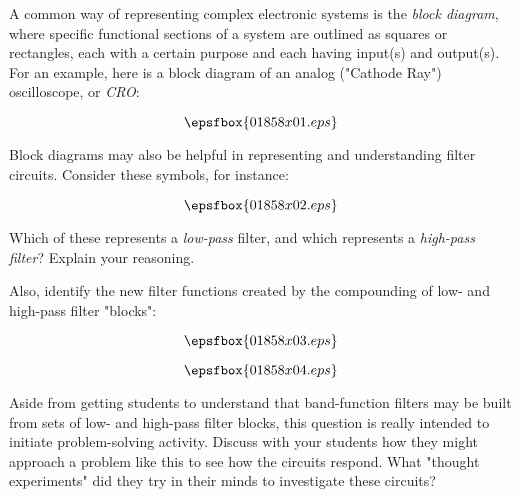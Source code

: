 

A common way of representing complex electronic systems is the {\it block diagram}, where specific functional sections of a system are outlined as squares or rectangles, each with a certain purpose and each having input(s) and output(s).  For an example, here is a block diagram of an analog ("Cathode Ray") oscilloscope, or {\it CRO}:

$$\epsfbox{01858x01.eps}$$

Block diagrams may also be helpful in representing and understanding filter circuits.  Consider these symbols, for instance:

$$\epsfbox{01858x02.eps}$$

Which of these represents a {\it low-pass} filter, and which represents a {\it high-pass filter}?  Explain your reasoning.

Also, identify the new filter functions created by the compounding of low- and high-pass filter "blocks":

$$\epsfbox{01858x03.eps}$$







$$\epsfbox{01858x04.eps}$$







Aside from getting students to understand that band-function filters may be built from sets of low- and high-pass filter blocks, this question is really intended to initiate problem-solving activity.  Discuss with your students how they might approach a problem like this to see how the circuits respond.  What "thought experiments" did they try in their minds to investigate these circuits?





